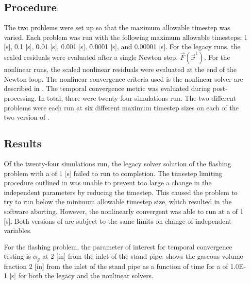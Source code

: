 \subsection{Procedure}
\label{subsect:procedures}

The two problems were set up so that the maximum allowable timestep was varied.
Each problem was run with the following maximum allowable timesteps: 1 [s], 0.1 [s], 0.01 [s], 0.001 [s], 0.0001 [s], and 0.00001 [s]. 
For the legacy runs, the scaled residuals were evaluated after a single Newton step, $\vec{F}(\vec{x}^{1})$.
For the nonlinear runs, the scaled nonlinear residuals were evaluated at the end of the Newton-loop.
The nonlinear convergence criteria used is the nonlinear solver are described in .
The temporal convergence metric was evaluated during post-processing.
In total, there were twenty-four simulations run.
The two different problems were each run at six different maximum timestep sizes on each of the two version of \cobra{}.

\subsection{Results}
\label{subsect:results}

Of the twenty-four simulations run, the legacy solver solution of the flashing problem with a \dtmax{} of 1 [s] failed to run to completion.
The timestep limiting procedure outlined in   was unable to prevent too large a change in the independent parameters by reducing the timestep.
This caused the problem to try to run below the minimum allowable timestep size, which resulted in the software aborting.
However, the nonlinearly convergent \cobra{} was able to run at a \dtmax{} of 1 [s].
Both versions of \cobra{} are subject to the same limits on change of independent variables.

For the flashing problem, the parameter of interest for temporal convergence testing is $\alpha_g$ at 2 [in] from the inlet of the stand pipe.
 shows the gaseous volume fraction 2 [in] from the inlet of the stand pipe as a function of time for a \dtmax{} of 1.0E-1 [s] for both the legacy and the nonlinear solvers.

